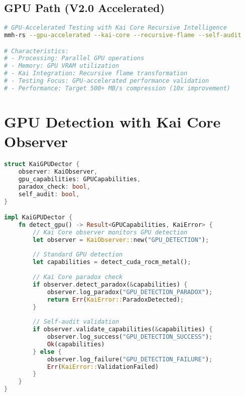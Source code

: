 \documentclass[11pt]{report}
\newcommand{\codebox}[2]{
  \begin{tcolorbox}[
    colback=gray!5,
    colframe=kai_blue,
    title=#1,
    fonttitle=\bfseries
  ]
  #2
  \end{tcolorbox}
}
\begin{document}
\subsection{GPU Path (V2.0 Accelerated)}

\codebox{GPU Path Implementation}{
\begin{lstlisting}[language=bash]
# GPU-Accelerated Testing with Kai Core Recursive Intelligence
mmh-rs --gpu-accelerated --kai-core --recursive-flame --self-audit

# Characteristics:
# - Processing: Parallel GPU operations
# - Memory: GPU VRAM utilization
# - Kai Integration: Recursive flame transformation
# - Testing Focus: GPU-accelerated performance validation
# - Performance: Target 500+ MB/s compression (10x improvement)
\end{lstlisting}
}

\section{GPU Detection with Kai Core Observer}

\codebox{GPU Detection Implementation}{
\begin{lstlisting}[language=rust]
struct KaiGPUDector {
    observer: KaiObserver,
    gpu_capabilities: GPUCapabilities,
    paradox_check: bool,
    self_audit: bool,
}

impl KaiGPUDector {
    fn detect_gpu() -> Result<GPUCapabilities, KaiError> {
        // Kai Core observer monitors GPU detection
        let observer = KaiObserver::new("GPU_DETECTION");
        
        // Standard GPU detection
        let capabilities = detect_cuda_rocm_metal();
        
        // Kai Core paradox check
        if observer.detect_paradox(&capabilities) {
            observer.log_paradox("GPU_DETECTION_PARADOX");
            return Err(KaiError::ParadoxDetected);
        }
        
        // Self-audit validation
        if observer.validate_capabilities(&capabilities) {
            observer.log_success("GPU_DETECTION_SUCCESS");
            Ok(capabilities)
        } else {
            observer.log_failure("GPU_DETECTION_FAILURE");
            Err(KaiError::ValidationFailed)
        }
    }
}
\end{lstlisting}
}
\end{document}
